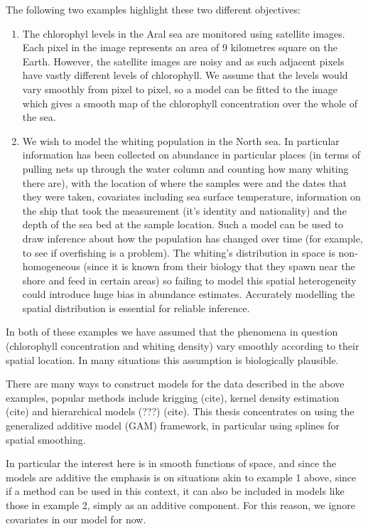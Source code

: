 The following two examples highlight these two different objectives:
\begin{enumerate}
\item The chlorophyl levels in the Aral sea are monitored using satellite images. Each pixel in the image represents an area of 9 kilometres square on the Earth. However, the satellite images are noisy and as such adjacent pixels have vastly different levels of chlorophyll. We assume that the levels would vary smoothly from pixel to pixel, so a model can be fitted to the image which gives a smooth map of the chlorophyll concentration over the whole of the sea.
\item We wish to model the whiting population in the North sea. In particular information has been collected on abundance in particular places (in terms of pulling nets up through the water column and counting how many whiting there are), with the location of where the samples were and the dates that they were taken, covariates including sea surface temperature, information on the ship that took the measurement (it's identity and nationality) and the depth of the sea bed at the sample location. Such a model can be used to draw inference about how the population has changed over time (for example, to see if overfishing is a problem). The whiting's distribution in space is non-homogeneous (since it is known from their biology that they spawn near the shore and feed in certain areas) so failing to model this spatial heterogeneity could introduce huge bias in abundance estimates. Accurately modelling the spatial distribution is essential for reliable inference.
\end{enumerate}
In both of these examples we have assumed that the phenomena in question (chlorophyll concentration and whiting density) vary smoothly according to their spatial location. In many situations this assumption is biologically plausible. 

There are many ways to construct models for the data described in the above examples, popular methods include krigging (cite), kernel density estimation (cite) and hierarchical models (???) (cite). This thesis concentrates on using the generalized additive model (GAM) framework, in particular using splines for spatial smoothing.

In particular the interest here is in smooth functions of space, and since the models are additive the emphasis is on situations akin to example 1 above, since if a method can be used in this context, it can also be included in models like those in example 2, simply as an additive component. For this reason, we ignore covariates in our model for now.

